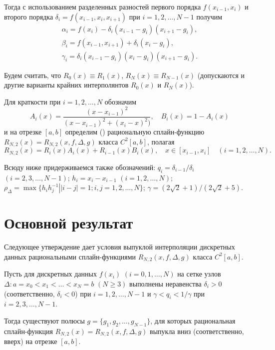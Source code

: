 Тогда с использованием разделенных разностей первого порядка $f(x_{i-1}, x_i)$ и второго порядка
$\delta_i=f(x_{i-1}, x_i, x_{i+1})$ при $i=1,2,\dots,N-1$ получим
\begin{equation*}
\begin{array}{l}
\alpha_i=f(x_i)-\delta_i(x_{i-1}-g_i)(x_{i+1}-g_i),\\[1ex]
\beta_i=f(x_{i-1}, x_{i+1})+\delta_i(x_i-g_i),\\[1ex]
\gamma_i=\delta_i(x_{i-1}-g_i)(x_i-g_i)(x_{i+1}-g_i).
\end{array}
\end{equation*}

Будем считать, что  $R_0(x)\equiv R_1(x)$, $R_N(x)\equiv R_{N-1}(x)$ (допускаются и другие варианты крайних интерполянтов
$R_0(x)$ и $R_N(x)$).

Для краткости при $i=1,2,\dots,N$ обозначим
\begin{equation*}
A_i(x)=\frac{(x-x_{i-1})^2}{(x-x_{i-1})^2+(x_i-x)^2)},\quad B_i(x)=1-A_i(x)
\end{equation*}
и на отрезке $[a,b]$ определим (\cite{ark-9}) рациональную сплайн-функцию \linebreak
$R_{N,2}(x)=R_{N,2} (x, f, \Delta,g)$ класса $C^2[a,b]$, полагая
\begin{equation*}
R_{N,2}(x)=R_i(x) A_i(x)+R_{i-1}(x)B_i(x), \quad x\in [x_{i-1}, x_i]\quad (i=1,2,\dots,N).
\end{equation*}

Всюду ниже придерживаемся также обозначений:
$q_i=\delta_{i-1}/\delta_i$ $(i=2,3,\dots,N-1)$; $h_i=x_i-x_{i-1}$ $(i=1,2,\dots,N)$;
$\rho_\Delta=\max\{\left.h_ih_j^{-1}\right\vert |i-j|=1; i,j=1,2,\dots,N\}$;
$\gamma= (2\sqrt 2+1)/(2\sqrt 2+5)$.


\section{Основной результат}

Следующее утверждение дает условия выпуклой интерполяции дискретных данных рациональными
сплайн-функциями $R_{N,2}(x, f, \Delta, g)$ класса $C^2[a,b]$.

\begin{theorem}\label{ark-teor2.1}
Пусть для дискретных данных $f(x_i)$ $(i=0,1,\dots,N)$  на сетке узлов
$\Delta: a=x_0<x_1<\dots<x_N=b$ $(N\geqslant 3)$ выполнены неравенства $\delta_i>0$
(соответственно, $\delta_i<0$) при $i=1,2,\dots,N-1$ и $\gamma<q_i<1/\gamma$ при
$i=2,3,\dots,N-1$.

Тогда существуют полюсы  $g=\{g_1,g_2,\dots,g_{N-1}\}$, для которых рациональная сплайн-функция
$R_{N,2}(x)=R_{N,2} (x, f, \Delta,g)$ выпукла вниз (соответственно, вверх) на отрезке $[a,b]$.
\end{theorem}

